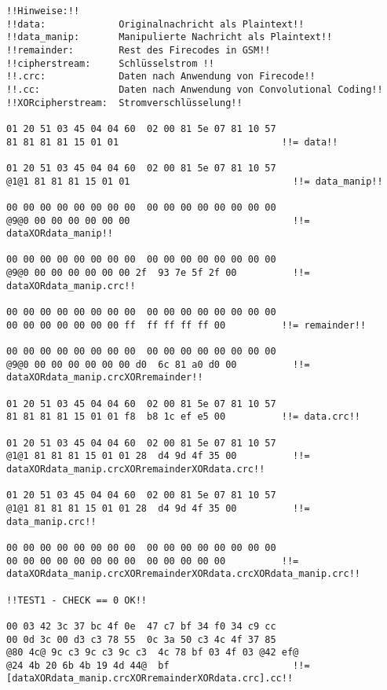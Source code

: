 \begin{lstlisting}[caption={Die Kommandozeilenausgabe von \texttt{setup\_manip\_test} aus osmoMITM}, boxpos=c, frame=single, language=bytetxt, numbers=none, basicstyle=\tiny\ttfamily, tabsize=1 ]
!!Hinweise:!!
!!data:             Originalnachricht als Plaintext!!
!!data_manip:       Manipulierte Nachricht als Plaintext!!
!!remainder:        Rest des Firecodes in GSM!!
!!cipherstream:     Schlüsselstrom !!
!!.crc:             Daten nach Anwendung von Firecode!!
!!.cc:              Daten nach Anwendung von Convolutional Coding!!
!!XORcipherstream:  Stromverschlüsselung!!

01 20 51 03 45 04 04 60  02 00 81 5e 07 81 10 57
81 81 81 81 15 01 01                             !!= data!!

01 20 51 03 45 04 04 60  02 00 81 5e 07 81 10 57 
@1@1 81 81 81 15 01 01                             !!= data_manip!!

00 00 00 00 00 00 00 00  00 00 00 00 00 00 00 00 
@9@0 00 00 00 00 00 00                             !!= dataXORdata_manip!!

00 00 00 00 00 00 00 00  00 00 00 00 00 00 00 00 
@9@0 00 00 00 00 00 00 2f  93 7e 5f 2f 00          !!= dataXORdata_manip.crc!!

00 00 00 00 00 00 00 00  00 00 00 00 00 00 00 00 
00 00 00 00 00 00 00 ff  ff ff ff ff 00          !!= remainder!!

00 00 00 00 00 00 00 00  00 00 00 00 00 00 00 00 
@9@0 00 00 00 00 00 00 d0  6c 81 a0 d0 00          !!= dataXORdata_manip.crcXORremainder!!

01 20 51 03 45 04 04 60  02 00 81 5e 07 81 10 57 
81 81 81 81 15 01 01 f8  b8 1c ef e5 00          !!= data.crc!!

01 20 51 03 45 04 04 60  02 00 81 5e 07 81 10 57 
@1@1 81 81 81 15 01 01 28  d4 9d 4f 35 00          !!= dataXORdata_manip.crcXORremainderXORdata.crc!!

01 20 51 03 45 04 04 60  02 00 81 5e 07 81 10 57 
@1@1 81 81 81 15 01 01 28  d4 9d 4f 35 00          !!= data_manip.crc!!

00 00 00 00 00 00 00 00  00 00 00 00 00 00 00 00 
00 00 00 00 00 00 00 00  00 00 00 00 00          !!= dataXORdata_manip.crcXORremainderXORdata.crcXORdata_manip.crc!!

!!TEST1 - CHECK == 0 OK!!

00 03 42 3c 37 bc 4f 0e  47 c7 bf 34 f0 34 c9 cc 
00 0d 3c 00 d3 c3 78 55  0c 3a 50 c3 4c 4f 37 85 
@80 4c@ 9c c3 9c c3 9c c3  4c 78 bf 03 4f 03 @42 ef@ 
@24 4b 20 6b 4b 19 4d 44@  bf                      !!= [dataXORdata_manip.crcXORremainderXORdata.crc].cc!!


\end{lstlisting}
